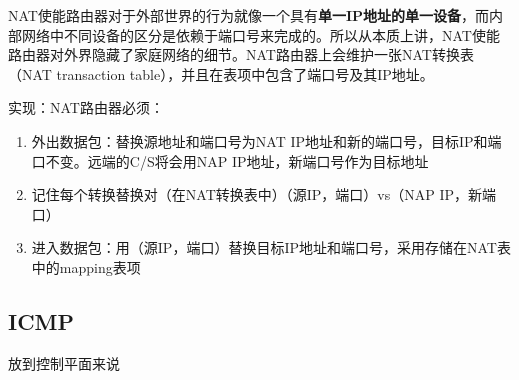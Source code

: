\documentclass[]{report}
\begin{document}
		NAT使能路由器对于外部世界的行为就像一个具有\textbf{单一IP地址的单一设备}，而内部网络中不同设备的区分是依赖于端口号来完成的。所以从本质上讲，NAT使能路由器对外界隐藏了家庭网络的细节。NAT路由器上会维护一张NAT转换表（NAT transaction table），并且在表项中包含了端口号及其IP地址。\par
		实现：NAT路由器必须：
		\begin{enumerate}
			\item 外出数据包：替换源地址和端口号为NAT IP地址和新的端口号，目标IP和端口不变。远端的C/S将会用NAP IP地址，新端口号作为目标地址
			\item 记住每个转换替换对（在NAT转换表中）（源IP，端口）vs（NAP IP，新端口）
			\item 进入数据包：用（源IP，端口）替换目标IP地址和端口号，采用存储在NAT表中的mapping表项
		\end{enumerate}\par
		\subsection{ICMP}
		放到控制平面来说
\end{document}
